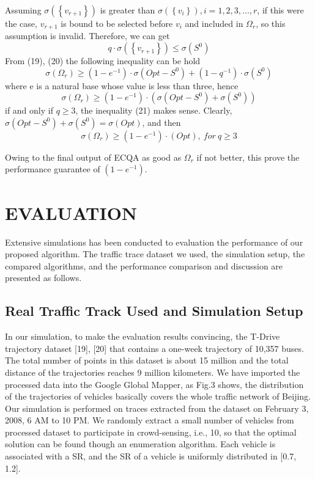 \documentclass[journal]{IEEEtran}
\begin{document}
Assuming $\sigma\left(\left \{ v_{r+1} \right \}\right)$ is greater than $\sigma\left ( \left \{ v_{i} \right \} \right),i=1,2,3,...,r$, if this were the case, $v_{r+1}$ is bound to be selected before $v_{i}$ and included in $\Omega _{r}$, so this assumption is invalid. Therefore, we can get
\begin{equation}
q\cdot \sigma \left ( \left \{ v_{r+1} \right \} \right )\leqslant \sigma \left ( S^{0} \right )
\end{equation}
From (19), (20) the following inequality can be hold
\begin{equation}
\sigma \left ( \Omega _{r} \right )\geqslant \left ( 1-e^{-1} \right )\cdot \sigma (Opt-S^{0})+(1-q^{-1})\cdot \sigma (S^{0})
\end{equation}
where e is a natural base whose value is less than three, hence
\begin{equation}
\sigma \left ( \Omega _{r} \right )\geqslant \left ( 1-e^{-1} \right )\cdot (\sigma (Opt-S^{0})+\sigma (S^{0}))
\end{equation}
if and only if $q\geqslant 3$, the inequality (21) makes sense. Clearly, $\sigma(Opt-S^{0})+\sigma (S^{0})=\sigma (Opt)$, and then
\begin{equation}
\sigma(\Omega_{r})\geqslant (1-e^{-1})\cdot (Opt), \ for \ q\geqslant 3
\end{equation}

Owing to the final output of ECQA as good as $\Omega_{r}$ if not better, this prove the performance guarantee of $(1-e^{-1})$.


\section{EVALUATION}
Extensive simulations has been conducted to evaluation the performance of our proposed algorithm. The traffic trace dataset we used, the simulation setup, the compared algorithms, and the performance comparison and discussion are presented as follows.


\subsection{Real Traffic Track Used and Simulation Setup}
In our simulation, to make the evaluation results convincing, the T-Drive trajectory dataset [19], [20] that contains a one-week trajectory of 10,357 buses. The total number of points in this dataset is about 15 million and the total distance of the trajectories reaches 9 million kilometers. We have imported the processed data into the Google Global Mapper, as Fig.3 shows, the distribution of the trajectories of vehicles basically covers the whole traffic network of Beijing. Our simulation is performed on traces extracted from the dataset on February 3, 2008, 6 AM to 10 PM. We randomly extract a small number of vehicles from processed dataset to participate in crowd-sensing, i.e., 10, so that the optimal solution can be found though an enumeration algorithm. Each vehicle is associated with a SR, and the SR of a vehicle is uniformly distributed in [0.7, 1.2].  
\end{document}
